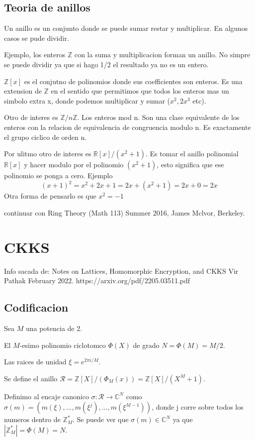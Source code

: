 \documentclass[12pt, oneside]{article}
\newcommand{\Rc}{\mathcal{R}}
\newcommand{\R}{\mathbb{R}}
\newcommand{\C}{\mathbb{C}}
\newcommand{\Z}{\mathbb{Z}}
\begin{document}
\subsection{Teoria de anillos}
Un anillo es un conjunto donde se puede sumar restar y multiplicar.
En algunos casos se pude dividir.

Ejemplo, los enteros $\Z$ con la suma y multiplicacion forman un anillo.
No simpre se puede dividir ya que si hago 1/2 el resultado ya no es un entero.

$\Z[x]$ es el conjutno de polinomios donde sus coefficientes son enteros.
Es una extension de $\Z$ en el sentido que permitimos que todos los enteros
mas un simbolo extra x, donde podemos multiplicar y sumar ($x^2, 2x^3$ etc).

Otro de interes es  $\Z/n\Z$. Los enteros mod n.
Son una clase equivalente de los enteros con la relacion de equivalencia de congruencia
modulo n.
Es exactamente el grupo ciclico de orden n.

Por ulitmo otro de interes es $\R[x]/(x^2+1)$.
Es tomar el anillo polinomial $\R[x]$ y hacer modulo por el polinomio $(x^2+1)$,
esto significa que ese polinomio se ponga a cero.
Ejemplo
\begin{equation*}
  (x+1)^2 = x^2 + 2x + 1 = 2x + (x^2 + 1) = 2x + 0 = 2x
\end{equation*}
Otra forma de pensarlo es que $x^2 = -1$

continuar con Ring Theory (Math 113) Summer 2016, James Mclvor, Berkeley.

\section{CKKS}
Info sacada de:
Notes on Lattices, Homomorphic Encryption, and CKKS
Vir Pathak
February 2022.
https://arxiv.org/pdf/2205.03511.pdf
\subsection{Codificacion}
Sea $M$ una potencia de 2.

El $M$-esimo polinomio ciclotomco $\Phi(X)$ de grado $N=\Phi(M)=M/2$.

Las raices de unidad $\xi=e^{2\pi i/M}$.

Se define el anillo $\Rc=\Z[X]/(\Phi_M(x))=\Z[X]/(X^M+1)$.

Definimo al encaje canonico $\sigma: \Rc\to\C^N$ como
$\sigma(m)=(m(\xi),...,m(\xi^j),...,m(\xi^{M-1}))$, donde j corre sobre todos los
numeros dentro de $\Z^*_M$.
Se puede ver que $\sigma(m)\in\C^N$ ya que $|\Z^*_M|=\Phi(M)=N$.
\end{document}
